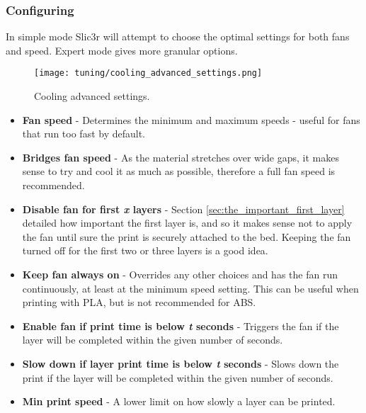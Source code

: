 \subsubsection{Configuring} %
\label{sub:configuring_cooling}

In simple mode Slic3r will attempt to choose the optimal settings for both fans and speed.  Expert mode gives more granular options.  

\begin{figure}[H]
\centering
\texttt{[image: tuning/cooling\_advanced\_settings.png]}
\caption{Cooling advanced settings.}
\label{fig:cooling_advanced_settings}
\end{figure}

\begin{itemize}
	\item \textbf{Fan speed}  - Determines the minimum and maximum speeds - useful for fans that run too fast by default.
	\item \textbf{Bridges fan speed}  - As the material stretches over wide gaps, it makes sense to try and cool it as much as possible, therefore a full fan speed is recommended.
	\item \textbf{Disable fan for first \textit{x} layers}  - Section \ref{sec:the_important_first_layer} detailed how important the first layer is, and so it makes sense not to apply the fan until sure the print is securely attached to the bed.  Keeping the fan turned off for the first two or three layers is a good idea.
	\item \textbf{Keep fan always on}  - Overrides any other choices and has the fan run continuously, at least at the minimum speed setting.  This can be useful when printing with PLA, but is not recommended for ABS.	
\end{itemize}

\begin{itemize}
	\item \textbf{Enable fan if print time is below \textit{t} seconds}  - Triggers the fan if the layer will be completed within the given number of seconds.
	\item \textbf{Slow down if layer print time is below \textit{t} seconds}  - Slows down the print if the layer will be completed within the given number of seconds.
	\item \textbf{Min print speed}  - A lower limit on how slowly a layer can be printed. 
\end{itemize}



